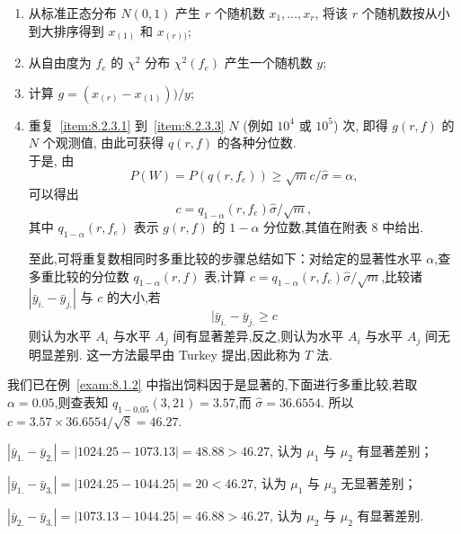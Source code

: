 \begin{enumerate}[label=\color{structurecolor}(\arabic*)]
  \item 从标准正态分布 $N(0,1)$ 产生 $r$ 个随机数 $x_1,\ldots, x_r$, 将该 $r$ 个随机数按从小到大排序得到 $x_{(1)}$ 和 $x_{(r))}$; \label{item:8.2.3.1}
  \item 从自由度为 $f_e$ 的 $\chi^2$ 分布 $\chi^2(f_e)$ 产生一个随机数 $y$; \label{item:8.2.3.2}
  \item 计算 $g =(x_{(r)}-x_{(1)}))/y$; \label{item:8.2.3.3}
  \item 重复~\ref{item:8.2.3.1} 到~\ref{item:8.2.3.3} $N$ (例如 $10^4$ 或 $10^5$) 次, 即得 $g(r,f)$ 的 $N$ 个观测值, 由此可获得 $q(r,f)$ 的各种分位数.\\
  于是, 由
  \begin{equation}\label{eq:8.2.3}
    P(W) = P(q(r,f_e)) \geq \sqrt{m} c/\hat{\sigma} = \alpha,
  \end{equation}
  可以得出
  \begin{equation}\label{eq:8.2.4}
    c = q_{1-\alpha}(r,f_e) \hat{\sigma}/\sqrt{m},
  \end{equation}
  其中 $q_{1-\alpha}(r,f_e)$ 表示 $g(r,f)$ 的 $1-\alpha$ 分位数,其值在附表 8 中给出.

至此,可将重复数相同时多重比较的步骤总结如下：对给定的显著性水平 $\alpha$,查多重比较的分位数 $q_{1-\alpha}(r,f)$ 表,计算 $c = q_{1-\alpha}(r,f_e)\hat{\sigma}/\sqrt{m}$,比较诸 $|\bar{y}_{i.} - \bar{y}_{j.}|$ 与 $c$ 的大小,若
\begin{equation*}
  |\bar{y}_{i.} - \bar{y}_{j.} \geq c
\end{equation*}
则认为水平 $A_i$ 与水平 $A_j$ 间有显著差异,反之,则认为水平 $A_i$ 与水平 $A_j$ 间无明显差别. 这一方法最早由 Turkey 提出,因此称为 $T$ 法.
\end{enumerate}

\begin{example}
  我们已在例~\ref{exam:8.1.2} 中指出饲料因于是显著的,下面进行多重比较,若取 $\alpha=0.05$,则查表知 $q_{1-0.05}(3,21)=3.57$,而 $\hat{\sigma} = 36.6554$. 所以 $c = 3.57 \times 36.6554/\sqrt{8} = 46.27$.
\end{example}

$\left|\bar{y}_{1.}-\bar{y}_{2.}\right|=|1024.25-1073.13|=48.88>46.27$, 认为 $\mu_1$ 与 $\mu_2$ 有显著差别；

$\left|\bar{y}_{1.}-\bar{y}_{3.}\right|=|1024.25-1044.25|=20<46.27$, 认为 $\mu_1$ 与 $\mu_3$ 无显著差别；

$\left|\bar{y}_{2.}-\bar{y}_{3.}\right|=|1073.13-1044.25|=46.88>46.27$, 认为 $\mu_2$ 与 $\mu_2$ 有显著差别.

